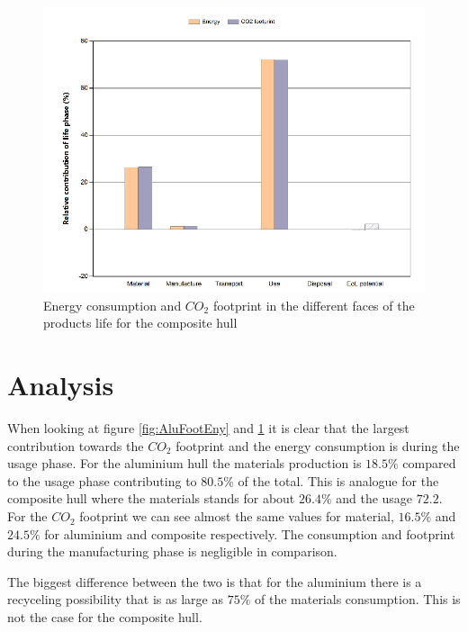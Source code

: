 \documentclass[12pt,a4paper]{article}
\begin{document}
\begin{center}
    \begin{figure}[H]
      \centering
      \includegraphics[scale=0.6]{CompFootEny.png}
       \caption{Energy consumption and $CO_2$ footprint in the different
      faces of the products life for the composite hull}
      \label{fig:CompFootEny}
    \end{figure}
\end{center}

\section{Analysis}
  When looking at figure \ref{fig:AluFootEny} and \ref{fig:CompFootEny}
  it is clear that the largest contribution towards the $CO_2$ footprint
  and the energy consumption is during the usage phase. For the
  aluminium hull the materials production is $18.5\%$ compared to the
  usage phase contributing to $80.5\%$ of the total. This is analogue
  for the composite hull where the materials stands for about $26.4\%$
  and the usage $72.2$. For the $CO_2$ footprint we can see almost the
  same values for material, $16.5\%$ and $24.5\%$ for aluminium and
  composite respectively. The consumption and footprint during the
  manufacturing phase is negligible in comparison.

  The biggest difference between the two is that for the aluminium there
  is a recyceling possibility that is as large as $75\%$ of the
  materials consumption. This is not the case for the composite hull.
\end{document}
